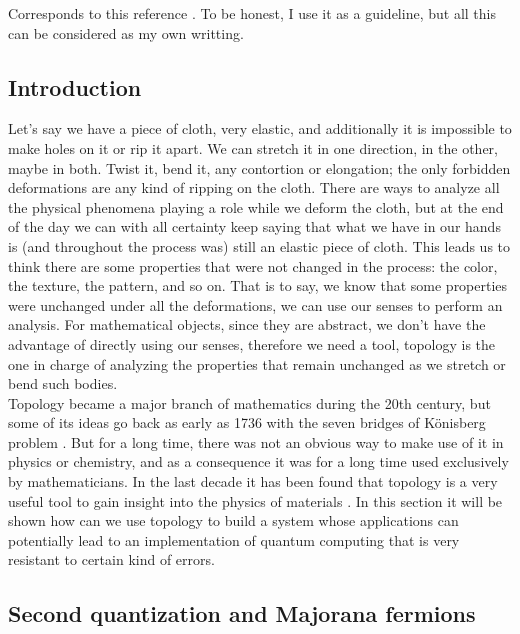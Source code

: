 Corresponds to this reference \cite{2014Hassler}. To be honest, I use it as a guideline, but all this can be considered as my own writting.\\

\subsection{Introduction}

Let's say we have a piece of cloth, very elastic, and additionally it is impossible to make holes on it or rip it apart. We can stretch it in one direction, in the other, maybe in both. Twist it, bend it, any contortion or elongation; the only forbidden deformations are any kind of ripping on the cloth. There are ways to analyze all the physical phenomena playing a role while we deform the cloth, but at the end of the day we can with all certainty keep saying that what we have in our hands is (and throughout the process was) still an elastic piece of cloth. This leads us to think there are some properties that were not changed in the process: the color, the texture, the pattern, and so on. That is to say, we know that some properties were unchanged under all the deformations, we can use our senses to perform an analysis. For mathematical objects, since they are abstract, we don't have the advantage of directly using our senses, therefore we need a tool, topology is the one in charge of analyzing the properties that remain unchanged as we stretch or bend such bodies.\\

Topology became a major branch of mathematics during the 20th century, but some of its ideas go back as early as 1736 with the seven bridges of Könisberg problem \cite{konigs}. But for a long time, there was not an obvious way to make use of it in physics or chemistry, and as a consequence it was for a long time used exclusively by mathematicians. In the last decade it has been found that topology is a very useful tool to gain insight into the physics of materials \cite{natTop}. In this section it will be shown how can we use topology to build a system whose applications can potentially lead to an implementation of quantum computing that is very resistant to certain kind of errors.

\subsection{Second quantization and Majorana fermions}

